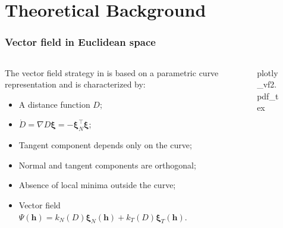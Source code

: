 \section{Theoretical Background}

\begin{frame}
    \frametitle{Vector field in Euclidean space}
    \begin{columns}[c]
        \begin{column}{7cm}
            The vector field strategy in \citet{Rezende2022} is based on a parametric curve representation and is characterized by:
            \begin{itemize}
                \item A distance function $D$;
                \item $\dot{D}=\nabla D\boldsymbol{\xi}=-\boldsymbol{\xi}_N^\top\boldsymbol{\xi}$;
                \item Tangent component depends only on the curve;
                \item Normal and tangent components are orthogonal;
                \item Absence of local minima outside the curve;
                \item Vector field $\Psi(\mathbf{h})=k_N(D)\boldsymbol{\xi}_N(\mathbf{h}) + k_T(D)\boldsymbol{\xi}_T(\mathbf{h})$.
            \end{itemize}
            
        \end{column}
        \begin{column}{8cm}
           \begin{figure}[ht!]
            \centering
            \def\svgwidth{\linewidth}
            {\footnotesize{plotly_vf2.pdf_tex}}
        \end{figure}
        \end{column}
    \end{columns}
\end{frame}
